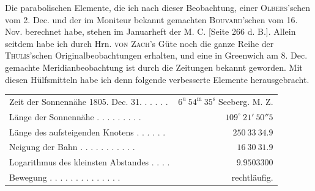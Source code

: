 \par\indent Die parabolischen Elemente, die ich nach dieser Beobachtung, einer \textsc{Olbers}'schen vom 2. Dec. und der im Moniteur bekannt gemachten \textsc{Bouvard}'schen vom 16. Nov. berechnet habe, stehen im Januarheft der M. C. [Seite 266 d. B.]. Allein seitdem habe ich durch Hrn. \textsc{von Zach}'s Güte noch die ganze Reihe der \textsc{Thulis}'schen Originalbeobachtungen erhalten, und eine in Greenwich am 8. Dec. gemachte Meridianbeobachtung ist durch die Zeitungen bekannt geworden. Mit diesen Hülfsmitteln habe ich denn folgende verbesserte Elemente herausgebracht.

\begin{center}
\begingroup\fontsize{8}{10}\selectfont\setlength{\tabcolsep}{2pt}\renewcommand{\arraystretch}{1.1}
\begin{tabular}{lr}
Zeit der Sonnennähe 1805. Dec. 31. . . . . . & $6^{\mathrm u}\ 54^{\mathrm m}\ 35^{\mathrm s}$ Seeberg. M. Z.\\
Länge der Sonnennähe . . . . . . . . . & $109^\circ\ 21'\ 50''5$\\
Länge des aufsteigenden Knotens . . . . . . & $250\ 33\ 34.9$\\
Neigung der Bahn . . . . . . . . . . . & $16\ 30\ 31.9$\\
Logarithmus des kleinsten Abstandes . . . . & $9.9503300$\\
Bewegung . . . . . . . . . . . . . . & rechtläufig.\\
\end{tabular}\endgroup
\end{center}

